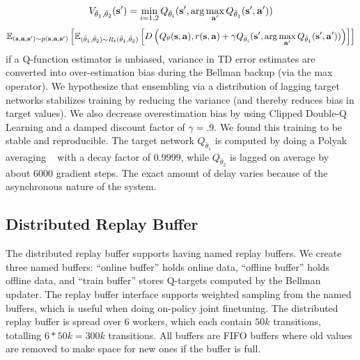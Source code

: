 \documentclass{article}
\begin{document}
\begin{equation*}
    V_{\bar{\theta}_1,\bar{\theta}_2}(\mathbf{s}') = \min_{i=1,2} Q_{\bar{\theta}_i}(\mathbf{s}',\arg\max_{\mathbf{a}'} Q_{\bar{\theta}_1}(\mathbf{s}',\mathbf{a}'))
\end{equation*}\iffalse\begin{equation*}
\mathbb{E}_{(\mathbf{s},\mathbf{a},\mathbf{s}') \sim p(\mathbf{s},\mathbf{a},\mathbf{s}')} \left[ \mathbb{E}_{(\bar{\theta}_1,\bar{\theta}_2) \sim R_t(\bar{\theta}_1,\bar{\theta}_2)} \left[ D \left(
Q_\theta(\mathbf{s},\mathbf{a}) , r(\mathbf{s},\mathbf{a}) + \gamma
Q_{\bar{\theta}_i}(\mathbf{s}',\arg\max_{\mathbf{a}'} Q_{\bar{\theta}_1}(\mathbf{s}',\mathbf{a}')) \right)
\right] \right]
\end{equation*}\fiEven if a Q-function estimator is unbiased, variance in TD error estimates are converted into over-estimation bias during the Bellman backup (via the max operator). We hypothesize that ensembling via a distribution of lagging target networks stabilizes training by reducing the variance (and thereby reduces bias in target values). We also decrease overestimation bias by using Clipped Double-Q Learning and a damped discount factor of $\gamma=.9$. We found this training to be stable and reproducible. The target network $Q_{\bar{\theta}_1}$ is computed by doing a Polyak averaging ~\citep{polyak1992acceleration} with a decay factor of $0.9999$, while $Q_{\bar{\theta}_2}$ is lagged on average by about 6000 gradient steps. The exact amount of delay varies because of the asynchronous nature of the system.

\subsection{Distributed Replay Buffer}

The distributed replay buffer supports having named replay buffers. We create three named buffers: \enquote{online buffer} holds online data, \enquote{offline buffer} holds offline data, and \enquote{train buffer} stores Q-targets computed by the Bellman updater. The replay buffer interface supports weighted sampling from the named buffers, which is useful when doing on-policy joint finetuning. The distributed replay buffer is spread over 6 workers, which each contain $50k$ transitions, totalling $6*50k=300k$ transitions. All buffers are FIFO buffers where old values are removed to make space for new ones if the buffer is full.
\end{document}
